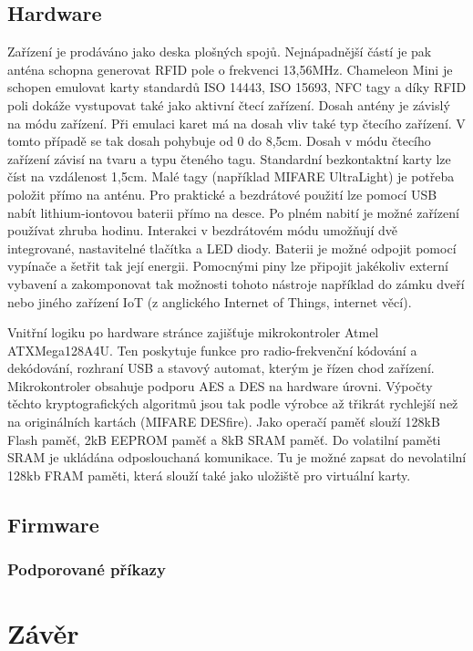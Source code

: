 \section{Hardware}
Zařízení je prodáváno jako deska plošných spojů. Nejnápadnější částí je pak anténa schopna generovat RFID pole o frekvenci 13,56MHz. Chameleon Mini je schopen emulovat karty standardů ISO 14443, ISO 15693, NFC tagy a díky RFID poli dokáže vystupovat také jako aktivní čtecí zařízení.\cite{ChameleonKickStarter} Dosah antény je závislý na módu zařízení. Při emulaci karet má na dosah vliv také typ čtecího zařízení. V tomto případě se tak dosah pohybuje od 0 do 8,5cm. Dosah v módu čtecího zařízení závisí na tvaru a typu čteného tagu. Standardní bezkontaktní karty lze číst na vzdálenost 1,5cm. Malé tagy (například MIFARE UltraLight) je potřeba položit přímo na anténu.\cite{ChameleonEshop} Pro praktické a bezdrátové použití lze pomocí USB nabít {lithium-iontovou} baterii přímo na desce. Po plném nabití je možné zařízení používat zhruba hodinu. Interakci v bezdrátovém módu umožňují dvě integrované, nastavitelné tlačítka a LED diody. Baterii je možné odpojit pomocí vypínače a šetřit tak její energii. Pomocnými piny lze připojit jakékoliv externí vybavení a zakomponovat tak možnosti tohoto nástroje například do zámku dveří nebo jiného zařízení IoT (z anglického Internet of Things, internet věcí).\cite{ChameleonKickStarter}
\par
Vnitřní logiku po hardware stránce zajišťuje mikrokontroler Atmel ATXMega128A4U. Ten poskytuje funkce pro {radio-frekvenční} kódování a dekódování, rozhraní USB a stavový automat, kterým je řízen chod zařízení. Mikrokontroler obsahuje podporu AES a DES na hardware úrovni. Výpočty těchto kryptografických algoritmů jsou tak podle výrobce až třikrát rychlejší než na originálních kartách (MIFARE DESfire). Jako operačí paměť slouží 128kB Flash paměť, 2kB EEPROM paměť a 8kB SRAM paměť. Do volatilní paměti SRAM je ukládána odposlouchaná komunikace. Tu je možné zapsat do nevolatilní 128kb FRAM paměti, která slouží také jako uložiště pro virtuální karty.\cite{ChameleonKickStarter}
\section{Firmware}

\subsection{Podporované příkazy}

\chapter{Závěr}
\label{zaver}


